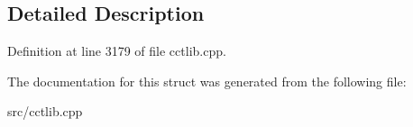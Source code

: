 \subsection{Detailed Description}


Definition at line 3179 of file cctlib.\-cpp.



The documentation for this struct was generated from the following file\-:\begin{DoxyCompactItemize}
\item 
src/cctlib.\-cpp\end{DoxyCompactItemize}
